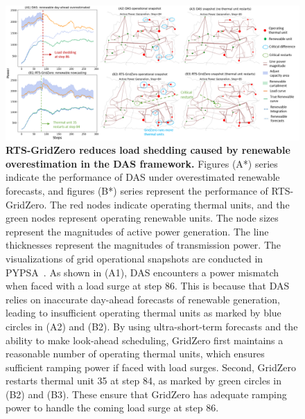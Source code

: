 \begin{figure}[h]
  \centering
  \includegraphics[width=1.0\linewidth]{fig/das_rts_snapshots.png}
  \caption{\textbf{RTS-GridZero reduces load shedding caused by renewable overestimation in the DAS framework.} Figures (A*) series indicate the performance of DAS under overestimated renewable forecasts, and figures (B*) series represent the performance of RTS-GridZero. 
  The red nodes indicate operating thermal units, and the green nodes represent operating renewable units. 
  The node sizes represent the magnitudes of active power generation. The line thicknesses represent the magnitudes of transmission power. The visualizations of grid operational snapshots are conducted in PYPSA~\cite{brown2017pypsa}. 
  As shown in (A1), DAS encounters a power mismatch when faced with a load surge at step 86. This is because that DAS relies on inaccurate day-ahead forecasts of renewable generation, leading to insufficient operating thermal units as marked by blue circles in (A2) and (B2). By using ultra-short-term forecasts and the ability to make look-ahead scheduling, GridZero first maintains a reasonable number of operating thermal units, which ensures sufficient ramping power if faced with load surges. Second, GridZero restarts thermal unit 35 at step 84, as marked by green circles in (B2) and (B3). These ensure that GridZero has adequate ramping power to handle the coming load surge at step 86.
  } 
  \label{fig:day_ahead_uc}
\end{figure}


